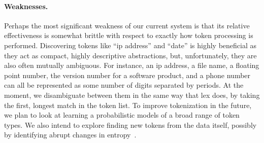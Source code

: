 \paragraph*{Weaknesses.}  Perhaps the most significant weakness of our current
system is that its relative effectiveness is somewhat brittle with respect to
exactly how token processing is performed.
Discovering tokens like ``ip address'' and ``date'' is highly beneficial
as they act as compact, highly 
descriptive abstractions, but, unfortunately, they are also often 
mutually ambiguous.  For instance, an ip address, a file name, a 
floating point number, the version number for a software product,
and a phone number can all be represented as some number of digits 
separated by periods.  At the moment, we disambiguate between them 
in the same way that lex does, by taking the first, longest match 
in the token list.
To improve tokenization in the future, we plan to look at learning
a probabilistic models of a broad range of token types.  We also
intend to explore finding new tokens from the data itself,
possibly by identifying abrupt changes in entropy~\cite{hutchens98finding}.




